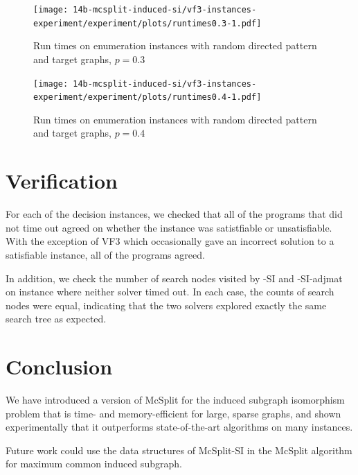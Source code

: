 \begin{figure}[h!]
    \centering
    \texttt{[image: 14b-mcsplit-induced-si/vf3-instances-experiment/experiment/plots/runtimes0.3-1.pdf]}
    \caption{Run times on enumeration instances with random directed pattern and target graphs, $p=0.3$}
    \label{figure:TODO}
\end{figure}

\begin{figure}[h!]
    \centering
    \texttt{[image: 14b-mcsplit-induced-si/vf3-instances-experiment/experiment/plots/runtimes0.4-1.pdf]}
    \caption{Run times on enumeration instances with random directed pattern and target graphs, $p=0.4$}
    \label{figure:TODO}
\end{figure}

\section{Verification}

For each of the decision instances, we checked that all of the programs that did not time out
agreed on whether the instance was satistfiable or unsatisfiable.  With the exception of VF3
which occasionally gave an incorrect solution to a satisfiable instance, all of the programs
agreed.

In addition, we check the number of search nodes visited by \McSplit-SI and \McSplit-SI-adjmat
on instance where neither solver timed out.  In each case, the counts of search nodes were equal,
indicating that the two solvers explored exactly the same search tree as expected.

\section{Conclusion}

We have introduced a version of McSplit for the induced subgraph isomorphism problem that is time- and memory-efficient for large, sparse graphs, and shown experimentally that it outperforms state-of-the-art algorithms on many instances.

Future work could use the data structures of McSplit-SI in the McSplit algorithm for maximum common induced subgraph.
